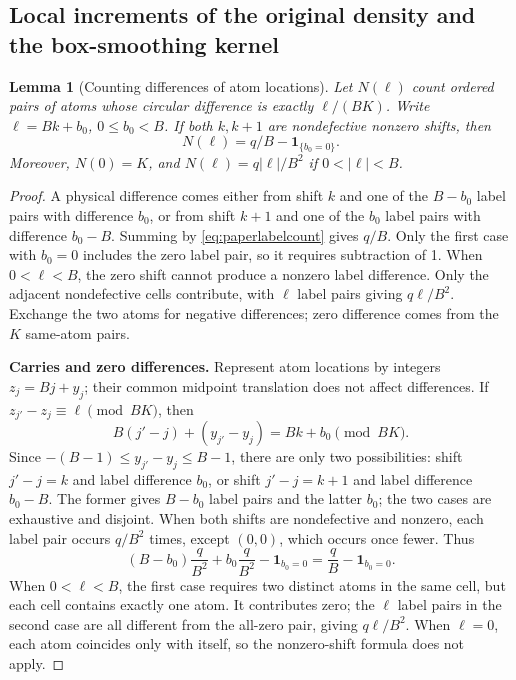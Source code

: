 \documentclass[a4paper,11pt]{article}
\newtheorem{lemma}{Lemma}[section]
\theoremstyle{remark}
\begin{document}
\subsection{Local increments of the original density and the box-smoothing kernel}
\begin{lemma}[Counting differences of atom locations]\label{lem:paperphysicalcount}
Let $N(\ell)$ count ordered pairs of atoms whose circular difference is exactly $\ell/(BK)$. Write
$\ell=Bk+b_0$, $0\le b_0<B$. If both $k,k+1$ are nondefective nonzero shifts, then
\[
 N(\ell)=q/B-\mathbf1_{\{b_0=0\}}.
\]
Moreover, $N(0)=K$, and $N(\ell)=q|\ell|/B^2$ if $0<|\ell|<B$.
\end{lemma}
\begin{proof}
A physical difference comes either from shift $k$ and one of the $B-b_0$ label pairs with difference $b_0$, or from shift $k+1$
and one of the $b_0$ label pairs with difference $b_0-B$. Summing by \eqref{eq:paperlabelcount} gives
$q/B$. Only the first case with $b_0=0$ includes the zero label pair, so it requires subtraction of 1.
When $0<\ell<B$, the zero shift cannot produce a nonzero label difference. Only the adjacent nondefective cells contribute,
with $\ell$ label pairs giving $q\ell/B^2$. Exchange the two atoms for negative differences; zero difference comes from the $K$ same-atom pairs.

\medskip\noindent\textbf{Carries and zero differences.}
Represent atom locations by integers $z_j=Bj+y_j$; their common midpoint translation does not affect differences.
If $z_{j'}-z_j\equiv\ell\pmod{BK}$, then
\[
 B(j'-j)+(y_{j'}-y_j)=Bk+b_0\pmod{BK}.
\]
Since $-(B-1)\le y_{j'}-y_j\le B-1$, there are only two possibilities:
shift $j'-j=k$ and label difference $b_0$, or shift $j'-j=k+1$ and label difference $b_0-B$.
The former gives $B-b_0$ label pairs and the latter $b_0$; the two cases are exhaustive and disjoint.
When both shifts are nondefective and nonzero, each label pair occurs $q/B^2$ times, except
$(0,0)$, which occurs once fewer. Thus
\[
 (B-b_0)\frac q{B^2}+b_0\frac q{B^2}-\mathbf1_{b_0=0}
 =\frac qB-\mathbf1_{b_0=0}.
\]
When $0<\ell<B$, the first case requires two distinct atoms in the same cell, but each cell contains exactly one atom.
It contributes zero; the $\ell$ label pairs in the second case are all different from the all-zero pair, giving $q\ell/B^2$.
When $\ell=0$, each atom coincides only with itself, so the nonzero-shift formula does not apply.

\end{proof}
\end{document}
